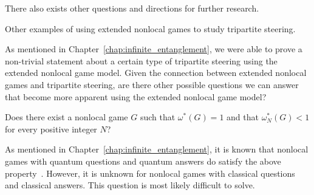 There also exists other questions and directions for further research. 

\begin{question}
	Other examples of using extended nonlocal games to study tripartite steering. 
\end{question}

As mentioned in Chapter~\ref{chap:infinite_entanglement}, we were able to prove a non-trivial statement about a certain type of tripartite steering using the extended nonlocal game model. Given the connection between extended nonlocal games and tripartite steering, are there other possible questions we can answer that become more apparent using the extended nonlocal game model? 

\begin{question}
	Does there exist a nonlocal game $G$ such that $\omega^*(G) = 1$ and that $\omega_N^*(G) < 1$ for every positive integer $N$?
\end{question}

As mentioned in Chapter~\ref{chap:infinite_entanglement}, it is known that nonlocal games with quantum questions and quantum answers do satisfy the above property~\cite{Leung2013}. However, it is unknown for nonlocal games with classical questions and classical answers. This question is most likely difficult to solve.
